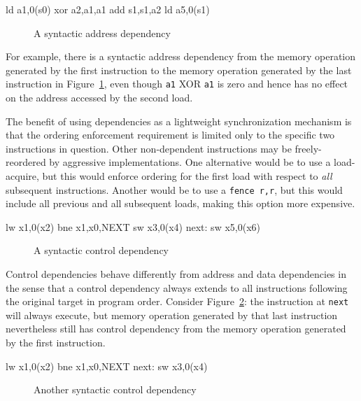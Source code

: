 \begin{verbbox}
ld  a1,0(s0)
xor a2,a1,a1
add s1,s1,a2
ld  a5,0(s1)
\end{verbbox}
\begin{figure}[h!]
  \centering\small
  \theverbbox
  \caption{A syntactic address dependency}
  \label{fig:litmus:address}
\end{figure}

For example, there is a syntactic address
dependency from the memory operation generated by the first instruction to the memory operation generated by the last instruction in
Figure~\ref{fig:litmus:address}, even though {\tt a1} XOR {\tt a1} is zero and
hence has no effect on the address accessed by the second load.

The benefit of using dependencies as a lightweight synchronization mechanism is that the ordering enforcement requirement is limited only to the specific two instructions in question.
Other non-dependent instructions may be freely-reordered by aggressive implementations.
One alternative would be to use a load-acquire, but this would enforce ordering for the first load with respect to {\em all} subsequent instructions.
Another would be to use a {\tt fence r,r}, but this would include all previous and all subsequent loads, making this option more expensive.

\begin{verbbox}
      lw  x1,0(x2)
      bne x1,x0,NEXT
      sw  x3,0(x4)
next: sw  x5,0(x6)
\end{verbbox}
\begin{figure}[h!]
  \centering\small
  \theverbbox
  \caption{A syntactic control dependency}
  \label{fig:litmus:control1}
\end{figure}

Control dependencies behave differently from address and data dependencies in the sense that a control dependency always extends to all instructions following the original target in program order.
Consider Figure~\ref{fig:litmus:control1}: the instruction at {\tt next} will always execute, but memory operation generated by that last instruction nevertheless still has control dependency from the memory operation generated by the first instruction.

\begin{verbbox}
        lw  x1,0(x2)
        bne x1,x0,NEXT
  next: sw  x3,0(x4)
\end{verbbox}
\begin{figure}[h!]
  \centering\small
  \theverbbox
  \caption{Another syntactic control dependency}
  \label{fig:litmus:control2}
\end{figure}

